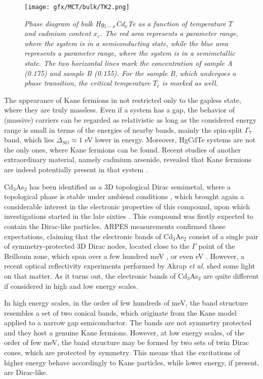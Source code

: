 \documentclass[titlepage,a4paper]{book}
\begin{document}
\begin{figure}[H]
	\centering
	\texttt{[image: gfx/MCT/bulk/TK2.png]}
	\vspace{-10pt}
	\caption{\textit{Phase diagram of bulk Hg$_{1-x}$Cd$_x$Te as a function of temperature $T$ and cadmium content $x_c$. The red area represents a parameter range, where the system is in a semiconducting state, while the blue area represents a parameter range, where the system is in a semimetallic state. The two horizontal lines mark the concentration of sample A (0.175) and sample B (0.155). For the sample B, which undergoes a phase transition, the critical temperature $T_c$ is marked as well.}}
	\label{fig:TK2}
\end{figure} 

The appearance of Kane fermions in not restricted only to the gapless state, where they are truly massless. Even if a system has a gap, the behavior of (massive) carriers can be regarded as relativistic as long as the considered energy range is small in terms of the energies of nearby bands, mainly the spin-split $\Gamma_7$ band, which lies $\Delta_{SO} \approx 1$ eV \cite{Novik_MCT} lower in energy. Moreover, HgCdTe systems are not the only ones, where Kane fermions can be found. Recent studies of another extraordinary material, namely cadmium arsenide, revealed that Kane fermions are indeed potentially present in that system \cite{Akrap_CdAs}.

Cd$_3$As$_2$ has been identified as a 3D topological Dirac semimetal, where a topological phase is stable under ambiend conditions \cite{Liu_CdAs}, which brought again a considerable interest in the electronic properties of this compound, upon which investigations started in the late sixties \cite{Roseman_CdAs}\cite{Bodnar_CdAs}. This compound was firstly expected to contain the Dirac-like particles. ARPES measurements confirmed those expectations, claiming that the electronic bands of Cd$_3$As$_2$ consist of a single pair of symmetry-protected 3D Dirac nodes, located close to the $\Gamma$ point of the Brillouin zone, which span over a few hundred meV \cite{Borisenko_CdAs}\cite{Neupane_CdAs}, or even eV \cite{Liu_CdAs}. However, a recent optical reflectivity experiments performed by Akrap \textit{et al.} \cite{Akrap_CdAs} shed some light on that matter. As it turns out, the electronic bands of Cd$_3$As$_2$ are quite different if considered in high and low energy scales. 

In high energy scales, in the order of few hundreds of meV, the band structure resembles a set of two conical bands, which originate from the Kane model applied to a narrow gap semiconductor. The bands are not symmetry protected and they host a genuine Kane fermions. However, at low energy scales, of the order of few meV, the band structure may be formed by two sets of twin Dirac cones, which are protected by symmetry. This means that the excitations of higher energy behave accordingly to Kane particles, while lower energy, if present, are Dirac-like. 
\end{document}
